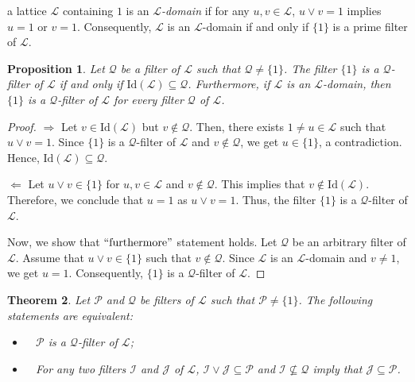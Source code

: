 \documentclass[10pt,a4paper]{amsart}
\newtheorem{theorem}{Theorem}[section]
\newtheorem{proposition}[theorem]{Proposition}
\numberwithin{equation}{section}
\begin{document}
a lattice $\mathcal{L}$ containing  $1$ is  an {\it $\mathcal{L}$-domain} if for any $u, v \in \mathcal{L}$, $ u \vee v = 1$ implies $u = 1$ or $ v = 1$.
 Consequently, $\mathcal{L}$ is an $\mathcal{L}$-domain if and only if $\{1\}$ is a prime filter of $\mathcal{L}$.
 \begin{proposition} \label{1}
 Let $\mathcal{Q}$ be a filter of $\mathcal{L}$ such that $\mathcal{Q} \neq \{1\}$. The filter $\{1\}$ is a $\mathcal{Q}$-filter of $\mathcal{L}$ if and only if $\text{Id}(\mathcal{L}) \subseteq \mathcal{Q}$. Furthermore,  if $\mathcal{L}$ is an $\mathcal{L}$-domain, then  $\{1\}$ is a $\mathcal{Q}$-filter of $\mathcal{L}$ for every filter $\mathcal{Q}$ of $\mathcal{L}$.
 \end{proposition}
 \begin{proof}
$\Longrightarrow$ Let   $v \in \text{Id}(\mathcal{L})$ but $v \notin  \mathcal{Q}$. Then, there exists $1 \neq u \in \mathcal{L}$ such that $u \vee v =1$. Since  $\{1\}$ is a $\mathcal{Q}$-filter of $\mathcal{L}$ and $v \notin \mathcal{Q}$, we get $u \in \{1\}$, a contradiction. Hence, $\text{Id}(\mathcal{L}) \subseteq \mathcal{Q}$.

$\Longleftarrow$ Let $u \vee v \in \{1\}$ for $u,v \in \mathcal{L}$ and $v \notin \mathcal{Q}$. This implies that $v \notin \text{Id}(\mathcal{L})$. Therefore, we conclude that $u=1$ as $u \vee v =1$. Thus, the filter $\{1\}$ is a $\mathcal{Q}$-filter of $\mathcal{L}$.
 

Now, we show that $``\text{furthermore}"$ statement holds. Let $\mathcal{Q}$ be an arbitrary filter of $\mathcal{L}$. Assume that $u \vee v \in \{1\}$ such that $ v \notin \mathcal{Q}$. Since $\mathcal{L}$ is an $\mathcal{L}$-domain  and $v \neq 1$, we get $u=1$. Consequently, $\{1\}$ is a $\mathcal{Q}$-filter of $\mathcal{L}$.
 \end{proof}
 

\begin{theorem} \label{2}
Let $\mathcal{P}$ and $ \mathcal{Q}$ be   filters  of $\mathcal{L}$ such that  $\mathcal{P} \neq \{1\}$.  The following statements are equivalent: 
\begin{itemize} 
\item[\rm(i)]~ $\mathcal{P}$ is a  $\mathcal{Q}$-filter of $\mathcal{L}$;
\item[\rm(ii)]~  For any two filters $\mathcal{I}$ and $\mathcal{J}$  of $\mathcal{L}$, $\mathcal{I} \vee \mathcal{J} \subseteq \mathcal{P}$ and $\mathcal{I} \nsubseteq \mathcal{Q}$ imply that   $\mathcal{J}  \subseteq \mathcal{P} $.
\end{itemize}
\end{theorem}
\end{document}
